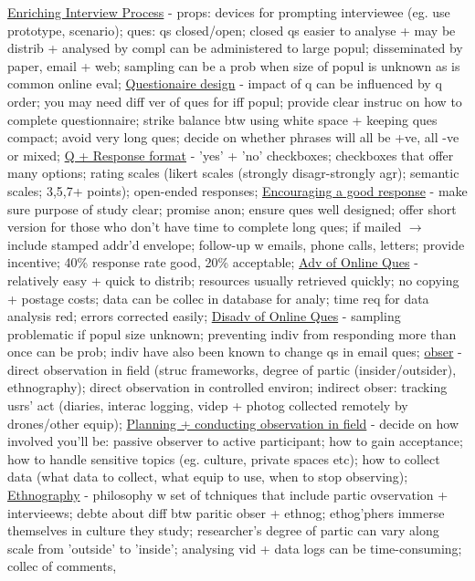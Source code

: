 \documentclass[a4paper]{article}
\begin{document}
\begin{multicols}{3}
        \underline{Enriching Interview Process} - props: devices for prompting interviewee (eg. use prototype, scenario); ques: qs closed/open; closed qs easier to analyse + may be distrib
        + analysed by compl can be administered to large popul; disseminated by paper, email + web; sampling can be a prob when size of popul is unknown as is common online eval;
        \underline{Questionaire design} - impact of q can be influenced by q order; you may need diff ver of ques for iff popul; provide clear instruc on how to complete questionnaire;
        strike balance btw using white space + keeping ques compact; avoid very long ques; decide on whether phrases will all be +ve, all -ve or mixed; \underline{Q + Response format} -
        'yes' + 'no' checkboxes; checkboxes that offer many options; rating scales (likert scales (strongly disagr-strongly agr); semantic scales; 3,5,7+ points); open-ended responses;
        \underline{Encouraging a good response} - make sure purpose of study clear; promise anon; ensure ques well designed; offer short version for those who don't have time to complete long ques;
        if mailed $\to$ include stamped addr'd envelope; follow-up w emails, phone calls, letters; provide incentive; 40\% response rate good, 20\% acceptable; \underline{Adv of Online Ques} -
        relatively easy + quick to distrib; resources usually retrieved quickly; no copying + postage costs; data can be collec in database for analy; time req for data analysis red; errors
        corrected easily; \underline{Disadv of Online Ques} - sampling problematic if popul size unknown; preventing indiv from responding more than once can be prob; indiv have also been known to change
        qs in email ques; \underline{obser} - direct observation in field (struc frameworks, degree of partic (insider/outsider), ethnography); direct observation in controlled environ;
        indirect obser: tracking usrs' act (diaries, interac logging, videp + photog collected remotely by drones/other equip); \underline{Planning + conducting observation in field} - decide on how
        involved you'll be: passive observer to active participant; how to gain acceptance; how to handle sensitive topics (eg. culture, private spaces etc); how to collect data (what data to collect, what
        equip to use, when to stop observing); \underline{Ethnography} - philosophy w set of tchniques that include partic ovservation + intervieews; debte about diff btw paritic obser + ethnog; ethog'phers
        immerse themselves in culture they study; researcher's degree of partic can vary along scale from 'outside' to 'inside'; analysing vid + data logs can be time-consuming; collec of comments,

\end{multicols}
\end{document}

